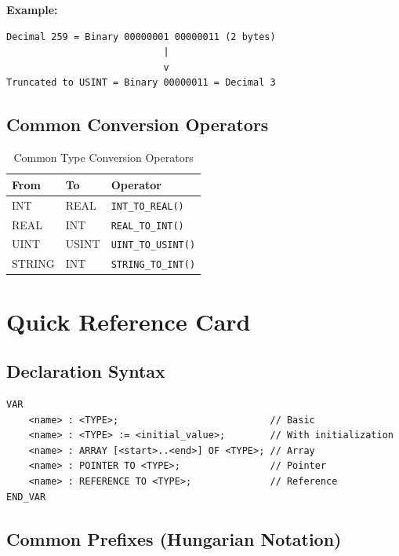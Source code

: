 \documentclass[11pt,a4paper]{article}
\begin{document}
\textbf{Example:}

\begin{verbatim}
Decimal 259 = Binary 00000001 00000011 (2 bytes)
                            |
                            v
Truncated to USINT = Binary 00000011 = Decimal 3
\end{verbatim}

\subsection{Common Conversion Operators}

\begin{table}[h]
\centering
\begin{tabular}{@{}lll@{}}
\toprule
\textbf{From} & \textbf{To} & \textbf{Operator} \\
\midrule
INT & REAL & \texttt{INT\_TO\_REAL()} \\
REAL & INT & \texttt{REAL\_TO\_INT()} \\
UINT & USINT & \texttt{UINT\_TO\_USINT()} \\
STRING & INT & \texttt{STRING\_TO\_INT()} \\
\bottomrule
\end{tabular}
\caption{Common Type Conversion Operators}
\end{table}

\newpage
\section*{Quick Reference Card}

\subsection*{Declaration Syntax}

\begin{lstlisting}
VAR
    <name> : <TYPE>;                           // Basic
    <name> : <TYPE> := <initial_value>;        // With initialization
    <name> : ARRAY [<start>..<end>] OF <TYPE>; // Array
    <name> : POINTER TO <TYPE>;                // Pointer
    <name> : REFERENCE TO <TYPE>;              // Reference
END_VAR
\end{lstlisting}

\subsection*{Common Prefixes (Hungarian Notation)}
\end{document}
